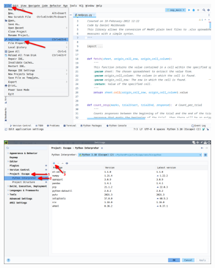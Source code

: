 \documentclass[a4paper,12pt]{article}
\begin{document}
\begin{figure}[!ht]
    \begin{center}
        \includegraphics[scale=0.4]{pycharm-settings.png}
    \end{center}
\end{figure}

\begin{figure}[!ht]
    \begin{center}
        \includegraphics[scale=0.4]{pycharm-interpreter-settings.png}
    \end{center}
\end{figure}
\end{document}
